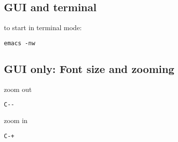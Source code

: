 \subsection{GUI and terminal}


to start in terminal mode:
\begin{verbatim}
emacs -nw
\end{verbatim}

\subsection{GUI only: Font size and zooming}

zoom out
\begin{verbatim}
C--
\end{verbatim}
zoom in
\begin{verbatim}
C-+
\end{verbatim}
